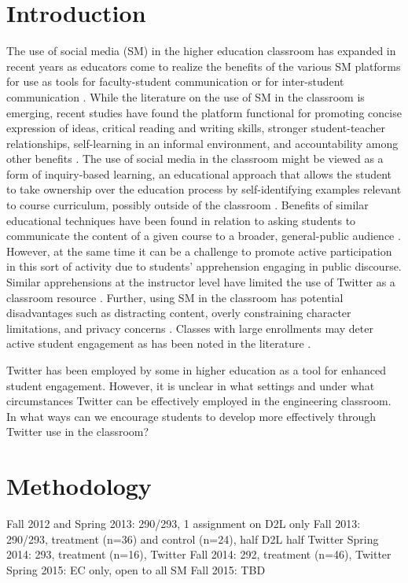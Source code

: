 \documentclass[12pt]{article}
\begin{document}
\section*{Introduction}
The use of social media (SM) in the higher education classroom has expanded in recent years as educators come to realize the benefits of the various SM platforms for use as tools for faculty-student communication or for inter-student communication \cite{blessing_using_2012}. While the literature on the use of SM in the classroom is emerging, recent studies have found the platform functional for promoting concise expression of ideas, critical reading and writing skills, stronger student-teacher relationships, self-learning in an informal environment, and accountability among other benefits \cite{shiffman_twitter_2012}. The use of social media in the classroom might be viewed as a form of inquiry-based learning, an educational approach that allows the student to take ownership over the education process by self-identifying examples relevant to course curriculum, possibly outside of the classroom \cite{magnussen_impact_2000, prince_does_2004}. Benefits of similar educational techniques have been found in relation to asking students to communicate the content of a given course to a broader, general-public audience \cite{junco_effect_2011, ha_influence_2013}. However, at the same time it can be a challenge to promote active participation in this sort of activity due to students’ apprehension engaging in public discourse. Similar apprehensions at the instructor level have limited the use of Twitter as a classroom resource \cite{carpenter_how_2014}. Further, using SM in the classroom has potential disadvantages such as distracting content, overly constraining character limitations, and privacy concerns \cite{dhir_tweeters_2013}. Classes with large enrollments may deter active student engagement as has been noted in the literature \cite{ahlfeldt_measurement_2005}.  

Twitter has been employed by some in higher education as a tool for enhanced student engagement. However, it is unclear in what settings and under what circumstances Twitter can be effectively employed in the engineering classroom. In what ways can we encourage students to develop more effectively through Twitter use in the classroom?


\section*{Methodology}
Fall 2012 and Spring 2013: 290/293, 1 assignment on D2L only
Fall 2013: 290/293, treatment (n=36) and control (n=24), half D2L half Twitter
Spring 2014: 293, treatment (n=16), Twitter
Fall 2014: 292, treatment (n=46), Twitter
Spring 2015: EC only, open to all SM
Fall 2015: TBD
\end{document}
